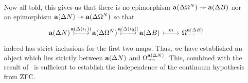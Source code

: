 Now all told, this gives us that there is no epimorphism
$\mathbf{a}(\Delta \Omega^N) \twoheadrightarrow \mathbf{a}(\Delta B)$ nor an
epimorphism $\mathbf{a}(\Delta N) \twoheadrightarrow \mathbf{a}(\Delta \Omega^N)$ so
that
\[
  \begin{tikzcd}
    \sheafify(\Delta N) \ar[r, rightarrowtail, "\sheafify(\Delta(\iota_1))"] &
    \sheafify(\Delta \Omega^N) \ar[r, rightarrowtail, "\sheafify(\Delta(\iota_2))"] &
    \sheafify(\Delta B) \ar[r, rightarrowtail, "m"] &
    \Omega_{\neg\neg}^{\sheafify(\Delta B)}
  \end{tikzcd}
\]
indeed has strict inclusions for the first two maps. Thus, we have
established an object which lies strictly between
$\mathbf{a}(\Delta N)$ and $\Omega_{\neg\neg}^{\mathbf{a}(\Delta N)}$.
This, combined with the result of~\citet{Fourman:80} is sufficient to
establish the independence of the continuum hypothesis from ZFC.
